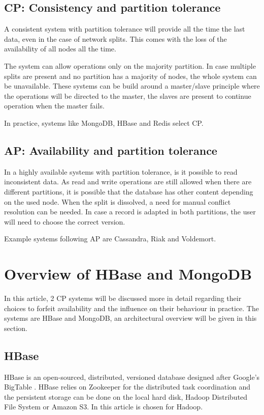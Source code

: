 \documentclass[10pt,conference,letterpaper]{IEEEtran}
\begin{document}
\subsection{CP: Consistency and partition tolerance}
A consistent system with partition tolerance will provide all the time the last data, even in the case of network splits. This comes with the loss of the availability of all nodes all the time. 

The system can allow operations only on the majority partition. In case multiple splits are present and no partition has a majority of nodes, the whole system can be unavailable. These systems can be build around a master/slave principle where the operations will be directed to the master, the slaves are present to continue operation when the master fails.

In practice, systems like MongoDB, HBase and Redis select CP. 

\subsection{AP: Availability and partition tolerance}
In a highly available systems with partition tolerance, is it possible to read inconsistent data. As read and write operations are still allowed when there are different partitions, it is possible that the database has other content depending on the used node. When the split is dissolved, a need for manual conflict resolution can be needed. In case a record is adapted in both partitions, the user will need to choose the correct version. 

Example systems following AP are Cassandra, Riak and Voldemort. 

\section{Overview of HBase and MongoDB}\label{sec:hbaseandmongodb}
In this article, 2 CP systems will be discussed more in detail regarding their choices to forfeit availability and the influence on their behaviour in practice. The systems are HBase and MongoDB, an architectural overview will be given in this section. 

\subsection{HBase}
HBase\cite{hbase-doc} is an open-sourced, distributed, versioned database designed after Google's BigTable \cite{chang2008bigtable}. HBase relies on Zookeeper for the distributed task coordination and the persistent storage can be done on the local hard disk, Hadoop Distributed File System or Amazon S3. In this article is chosen for Hadoop. 
\end{document}
